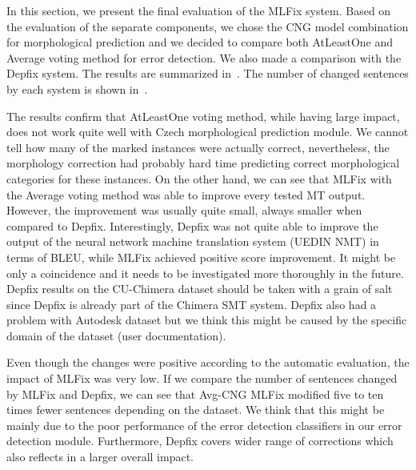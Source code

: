 In this section, we present the final evaluation of the MLFix system. Based on the evaluation of the
separate components, we chose the CNG model combination for morphological prediction and we
decided to compare both AtLeastOne and Average voting method for error detection. We
also made a comparison with the Depfix system. The results are summarized in~.
The number of changed sentences by each system is shown in~.

The results confirm that AtLeastOne voting method, while having large impact, does not work
quite well with Czech morphological prediction module. We cannot tell how many of the marked instances were actually
correct, nevertheless, the morphology correction had probably hard time predicting correct morphological categories
for these instances. On the other hand, we can see that MLFix with the Average voting method
was able to improve every tested MT output. However, the improvement was
usually quite small, always smaller when compared to Depfix. Interestingly,
Depfix was not quite able to improve the output of the neural network machine translation system (UEDIN NMT) in terms of BLEU,
while MLFix achieved positive score improvement. It might be only a coincidence and it needs to be investigated more thoroughly
in the future. Depfix results on the CU-Chimera dataset should be taken with a grain of salt since
Depfix is already part of the Chimera SMT system. Depfix also had a problem with Autodesk dataset
but we think this might be caused by the specific domain of the dataset (user documentation).

Even though the changes were positive according to the automatic evaluation, the impact of MLFix was
very low. If we compare the number of sentences changed by MLFix and Depfix, we can see that Avg-CNG MLFix
modified five to ten times fewer sentences depending on the dataset. We think that this might be
mainly due to the poor performance of the error detection classifiers in our error detection module.
Furthermore, Depfix covers wider range of corrections which also reflects in a larger overall impact.

